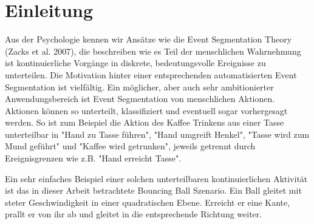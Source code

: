 \chapter{Einleitung}
\label{ch:introduction}
	Aus der Psychologie kennen wir Ansätze wie die Event Segmentation Theory (Zacks et al. 2007), die beschreiben wie es Teil der menschlichen Wahrnehmung ist kontinuierliche Vorgänge in diskrete, bedeutungsvolle Ereignisse zu unterteilen\cite{bib:est}.  
		Die Motivation hinter einer entsprechenden automatisierten Event Segmentation ist vielfältig. Ein möglicher, aber auch sehr ambitionierter Anwendungsbereich ist Event Segmentation von menschlichen Aktionen. Aktionen können so unterteilt, klassifiziert und eventuell sogar vorhergesagt werden. So ist zum Beispiel die Aktion des Kaffee Trinkens aus einer Tasse unterteilbar in "Hand zu Tasse führen", "Hand umgreift Henkel", "Tasse wird zum Mund geführt" und "Kaffee wird getrunken", jeweils getrennt durch Ereignisgrenzen wie z.B. "Hand erreicht Tasse". 
		
		Ein sehr einfaches Beispiel einer solchen unterteilbaren kontinuierlichen Aktivität ist das in dieser Arbeit betrachtete Bouncing Ball Szenario. Ein Ball gleitet mit steter Geschwindigkeit in einer quadratischen Ebene. Erreicht er eine Kante, prallt er von ihr ab und gleitet in die entsprechende Richtung weiter.
		
		
	
 